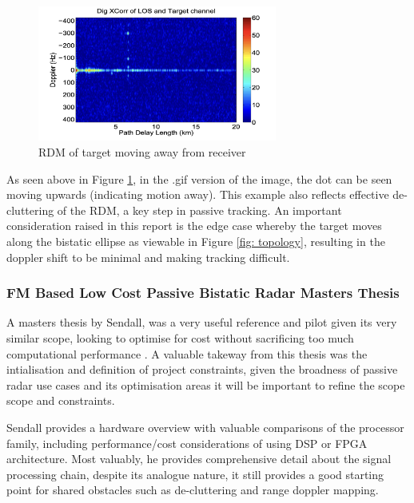 \documentclass[12pt,a4paper]{article}
\begin{document}
\begin{figure}[htbp]
    \centering
    \includegraphics[width=0.7\textwidth]{movingTarget.jpg}
    \caption{RDM of target moving away from receiver \cite{DTSO2009}}
    \label{fig:rdm}
\end{figure}

\noindent As seen above in Figure \ref{fig:rdm}, in the .gif version of the image, the dot can be seen moving upwards (indicating motion away). This example also reflects effective de-cluttering of the RDM, a key step in passive tracking. An important consideration raised in this report is the edge case whereby the target moves along the bistatic ellipse as viewable in Figure \ref{fig: topology}, resulting in the doppler shift to be minimal and making tracking difficult.

\subsubsection{FM Based Low Cost Passive Bistatic Radar Masters Thesis}
A masters thesis by Sendall, was a very useful reference and pilot given its very similar scope, looking to optimise for cost without sacrificing too much computational performance \cite{FMlowCost}. A valuable takeway from this thesis was the intialisation and definition of project constraints, given the broadness of passive radar use cases and its optimisation areas it will be important to refine the scope scope and constraints.

\par \vspace{0.5cm} 
\noindent Sendall provides a hardware overview with valuable comparisons of the processor family, including performance/cost considerations of using DSP or FPGA architecture. Most valuably, he provides comprehensive detail about the signal processing chain, despite its analogue nature, it still provides a good starting point for shared obstacles such as de-cluttering and range doppler mapping.
\end{document}
